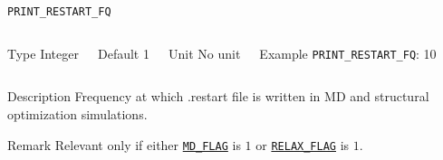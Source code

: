 \documentclass[xcolor=dvipsnames,t]{beamer}
\begin{document}
\begin{frame}[allowframebreaks]{\texttt{PRINT\_RESTART\_FQ}} \label{PRINT_RESTART_FQ}
\vspace*{-12pt}
\begin{columns}
\begin{block}{Type}
Integer
\end{block}

\begin{block}{Default}
1
\end{block}

\begin{block}{Unit}
No unit
\end{block}

\begin{block}{Example}
\texttt{PRINT\_RESTART\_FQ}: 10
\end{block}
\end{columns}

\begin{block}{Description}
Frequency at which .restart file is written in MD and structural optimization simulations.
\end{block}

\begin{block}{Remark}
Relevant only if either \hyperlink{MD_FLAG}{\texttt{MD\_FLAG}} is $1$ or \hyperlink{RELAX_FLAG}{\texttt{RELAX\_FLAG}} is $1$.
\end{block}

\end{frame}
\end{document}
